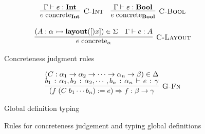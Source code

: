 \begin{figure}[b]
\centering
\begin{minipage}{1.0\linewidth}
{\footnotesize{
\[
  \begin{array}{c}
    \labinfer[C-Int]{e \concrete{\Int}}
      {\Gamma \vdash e : \Int}
    ~~~
    \labinfer[C-Bool]{e \concrete{\Bool}}
      {\Gamma \vdash e : \Bool}
    \\\\
    \labinfer[C-Layout]{e \concrete{\alpha}}
      {(A : \alpha \monic \layout[x]) \in \Sigma &
       \Gamma \vdash e : A
      }
  \end{array}
\]
}}
\end{minipage}
  \caption{Concreteness judgment rules}
  \label{fig:concreteness-rules}
\begin{minipage}{1.0\linewidth}
{\footnotesize{
\[
\begin{array}{c}
  \labinfer[G-Fn]{(f\; (C\; b_1 \cdots b_n) := e) \Rightarrow f : \beta \rightarrow \gamma}
    {(C : \alpha_1 \rightarrow \alpha_2 \rightarrow \cdots \rightarrow \alpha_n \rightarrow \beta) \in \Delta\\
    b_1 : \alpha_1, b_2 : \alpha_2, \cdots, b_n : \alpha_n \vdash e : \gamma
    }
\end{array}
\]
}}
\end{minipage}
  \caption{Global definition typing}
  \label{fig:globals-typing-rules}
\caption{Rules for concreteness judgement and typing global definitions}
\label{fig:meh}
\end{figure}

